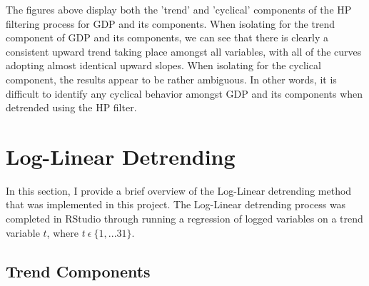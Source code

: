 \documentclass[12pt]{article}
\begin{document}
\begin{flushleft}
The figures above display both the 'trend' and 'cyclical' components of the HP filtering process for GDP and its components. 
\break
\linebreak
When isolating for the trend component of GDP and its components, we can see that there is clearly a consistent upward trend taking place amongst all variables, with all of the curves adopting almost identical upward slopes.
\break
\linebreak
When isolating for the cyclical component, the results appear to be rather ambiguous. In other words, it is difficult to identify any cyclical behavior amongst GDP and its components when detrended using the HP filter.

\end{flushleft}

\newpage

\section{Log-Linear Detrending}

In this section, I provide a brief overview of the Log-Linear detrending method that was implemented in this project. The Log-Linear detrending process was completed in RStudio through running a regression of logged variables on a trend variable $t$, where $t \ \epsilon \ \{1,...31\}$.

\subsection{Trend Components}
\end{document}
